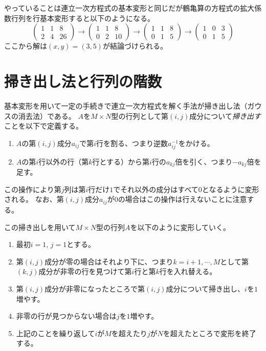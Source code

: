 \begin{example}
やっていることは連立一次方程式の基本変形と同じだが鶴亀算の方程式の拡大係数行列を行基本変形すると以下のようになる。
$$
\begin{pmatrix}1 & 1 & 8 \\ 2 & 4 & 26\end{pmatrix}
\to \begin{pmatrix}1 & 1 & 8 \\ 0 & 2 & 10\end{pmatrix}
\to \begin{pmatrix}1 & 1 & 8 \\ 0 & 1 & 5\end{pmatrix}
\to \begin{pmatrix}1 & 0 & 3 \\ 0 & 1 & 5\end{pmatrix}
$$
ここから解は$(x, y) = (3, 5)$が結論づけられる。
\end{example}

\section{掃き出し法と行列の階数}

基本変形を用いて一定の手続きで連立一次方程式を解く手法が掃き出し法（ガウスの消去法）である。
$A$を$M\times N$型の行列として第$(i, j)$成分について\emph{掃き出す}ことを以下で定義する。

\begin{enumerate}
\item
$A$の第$(i, j)$成分$a_{i j}$で第$i$行を割る、つまり逆数$a_{i j}^{-1}$をかける。
\item
$A$の第$i$行以外の行（第$k$行とする）から第$i$行の$a_{k j}$倍を引く、つまり$-a_{k j}$倍を足す。
\end{enumerate}

この操作により第$j$列は第$i$行だけ$1$でそれ以外の成分はすべて$0$となるように変形される。
なお、第$(i, j)$成分$a_{i j}$が$0$の場合はこの操作は行えないことに注意する。

この掃き出しを用いて$M\times N$型の行列$A$を以下のように変形していく。

\begin{enumerate}
\item
最初$i = 1$, $j = 1$とする。
\item
第$(i, j)$成分が零の場合はそれより下に、つまり$k = i+1, \cdots, M$として第$(k, j)$成分が非零の行を見つけて第$i$行と第$k$行を入れ替える。
\item
第$(i, j)$成分が非零になったところで第$(i, j)$成分について掃き出し、$i$を$1$増やす。
\item
非零の行が見つからない場合は$j$を$1$増やす。
\item
上記のことを繰り返して$i$が$M$を超えたり$j$が$N$を超えたところで変形を終了する。
\end{enumerate}

